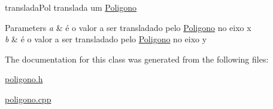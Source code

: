 translada\+Pol translada um \hyperlink{class_poligono}{Poligono} 


\begin{DoxyParams}{Parameters}
{\em a} & é o valor a ser transladado pelo \hyperlink{class_poligono}{Poligono} no eixo x \\
\hline
{\em b} & é o valor a ser transladado pelo \hyperlink{class_poligono}{Poligono} no eixo y \\
\hline
\end{DoxyParams}


The documentation for this class was generated from the following files\+:\begin{DoxyCompactItemize}
\item 
\hyperlink{poligono_8h}{poligono.\+h}\item 
\hyperlink{poligono_8cpp}{poligono.\+cpp}\end{DoxyCompactItemize}
